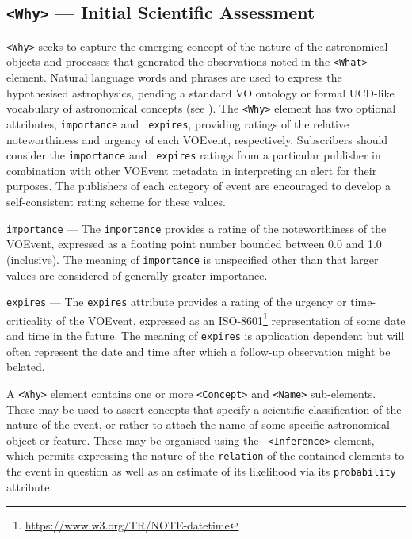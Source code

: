 \documentclass[11pt,a4paper]{ivoa}
\begin{document}
\subsection{{\tt <Why>} --- Initial Scientific Assessment}
\label{sec:3.6}
{\tt <Why>} seeks to capture the emerging concept of the nature of the 
astronomical objects and processes that generated the observations noted in the 
{\tt <What>} element. Natural language words and phrases are used to express the 
hypothesised astrophysics, pending a standard VO ontology or formal UCD-like 
vocabulary of astronomical concepts (see \citep{2018ivoa.spec.0527P}).
The {\tt <Why>} element has two optional attributes, {\tt importance} and {\tt 
expires}, providing ratings of the relative noteworthiness and urgency of each 
VOEvent, respectively. Subscribers should consider the {\tt importance} and {\tt
expires} ratings from a particular publisher in combination with other VOEvent 
metadata in interpreting an alert for their purposes. The publishers of each 
category of event are encouraged to develop a self-consistent rating scheme for 
these values. 

 {\tt importance}\label{sec:3.6.1} ---
The {\tt importance} provides a rating of the noteworthiness of the VOEvent, 
expressed as a floating point number bounded between 0.0 and 1.0 (inclusive). 
The meaning of {\tt importance} is unspecified other than that larger values are
considered of generally greater importance. 

 {\tt expires}\label{sec:3.6.2} --- 
The {\tt expires} attribute provides a rating of the urgency or time-criticality
of the VOEvent, expressed as an ISO-8601\footnote{\url{
https://www.w3.org/TR/NOTE-datetime}} representation of some date and time in 
the future. The meaning of {\tt expires} is application dependent but will often
represent the date and time after which a follow-up observation might be 
belated. 

A {\tt <Why>} element contains one or more {\tt <Concept>} and {\tt <Name>} 
sub-elements. These may be used to assert concepts that specify a scientific 
classification of the nature of the event, or rather to attach the name of some 
specific astronomical object or feature. These may be organised using the {\tt 
<Inference>} element, which permits expressing the nature of the {\tt relation} 
of the contained elements to the event in question as well as an estimate of its 
likelihood via its {\tt probability} attribute. 
\end{document}
